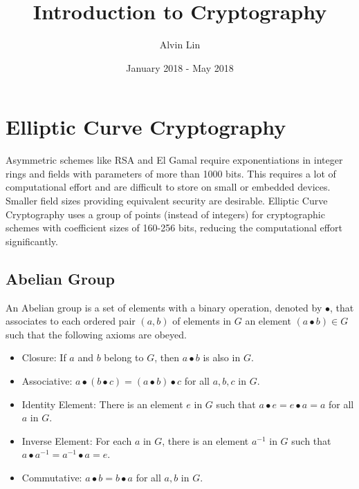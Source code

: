 \documentclass{math}
\title{Introduction to Cryptography}
\author{Alvin Lin}
\date{January 2018 - May 2018}
\begin{document}
\maketitle

\section*{Elliptic Curve Cryptography}
Asymmetric schemes like RSA and El Gamal require exponentiations in integer
rings and fields with parameters of more than 1000 bits. This requires a lot
of computational effort and are difficult to store on small or embedded devices.
Smaller field sizes providing equivalent security are desirable. Elliptic Curve
Cryptography uses a group of points (instead of integers) for cryptographic
schemes with coefficient sizes of 160-256 bits, reducing the computational
effort significantly.

\subsection*{Abelian Group}
An Abelian group is a set of elements with a binary operation,
denoted by \( \bullet \), that associates to each ordered pair \( (a,b) \) of
elements in \( G \) an element \( (a\bullet b)\in G \) such that the following
axioms are obeyed.
\begin{itemize}
  \item Closure: If \( a \) and \( b \) belong to \( G \), then \( a\bullet b \)
  is also in \( G \).
  \item Associative: \( a\bullet(b\bullet c) = (a\bullet b)\bullet c \) for all
  \( a,b,c \) in \( G \).
  \item Identity Element: There is an element \( e \) in \( G \) such that
  \( a\bullet e = e\bullet a = a \) for all \( a \) in \( G \).
  \item Inverse Element: For each \( a \) in \( G \), there is an element
  \( a^{-1} \) in \( G \) such that \( a\bullet a^{-1} = a^{-1}\bullet a = e \).
  \item Commutative: \( a\bullet b = b\bullet a \) for all \( a,b \) in \( G \).
\end{itemize}
\end{document}
